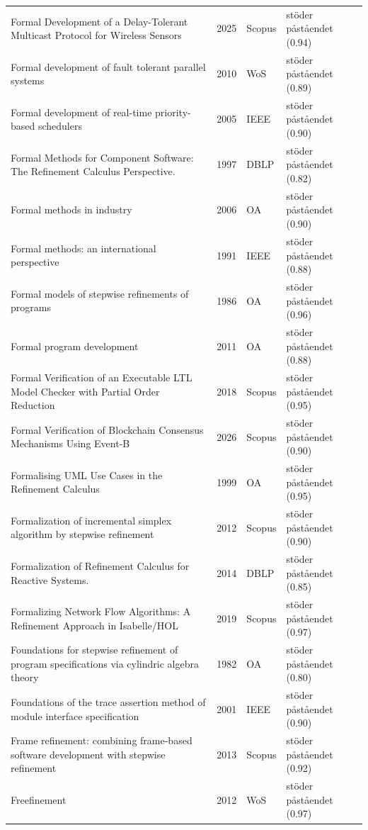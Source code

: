 \begin{longtable}{@{}%
  >{\raggedright\arraybackslash}p{}c%
  >{\raggedright\arraybackslash}p{}%
  >{\raggedright\arraybackslash}p{}@{}}
Formal Development of a Delay-Tolerant Multicast Protocol for Wireless Sensors & 2025 & Scopus & stöder påståendet (0.94) \\
Formal development of fault tolerant parallel systems & 2010 & WoS & stöder påståendet (0.89) \\
Formal development of real-time priority-based schedulers & 2005 & IEEE & stöder påståendet (0.90) \\
Formal Methods for Component Software: The Refinement Calculus Perspective. & 1997 & DBLP & stöder påståendet (0.82) \\
Formal methods in industry & 2006 & OA & stöder påståendet (0.90) \\
Formal methods: an international perspective & 1991 & IEEE & stöder påståendet (0.88) \\
Formal models of stepwise refinements of programs & 1986 & OA & stöder påståendet (0.96) \\
Formal program development & 2011 & OA & stöder påståendet (0.88) \\
Formal Verification of an Executable LTL Model Checker with Partial Order Reduction & 2018 & Scopus & stöder påståendet (0.95) \\
Formal Verification of Blockchain Consensus Mechanisms Using Event-B & 2026 & Scopus & stöder påståendet (0.90) \\
Formalising UML Use Cases in the Refinement Calculus & 1999 & OA & stöder påståendet (0.95) \\
Formalization of incremental simplex algorithm by stepwise refinement & 2012 & Scopus & stöder påståendet (0.90) \\
Formalization of Refinement Calculus for Reactive Systems. & 2014 & DBLP & stöder påståendet (0.85) \\
Formalizing Network Flow Algorithms: A Refinement Approach in Isabelle/HOL & 2019 & Scopus & stöder påståendet (0.97) \\
Foundations for stepwise refinement of program specifications via cylindric algebra theory & 1982 & OA & stöder påståendet (0.80) \\
Foundations of the trace assertion method of module interface specification & 2001 & IEEE & stöder påståendet (0.90) \\
Frame refinement: combining frame-based software development with stepwise refinement & 2013 & Scopus & stöder påståendet (0.92) \\
Freefinement & 2012 & WoS & stöder påståendet (0.97) \\

\end{longtable}
